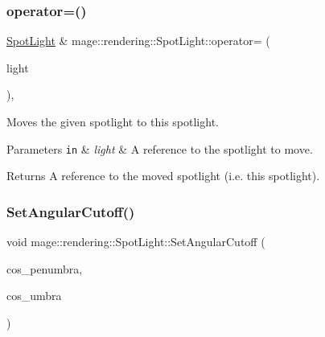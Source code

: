 \subsubsection{\texorpdfstring{operator=()}{operator=()}\hspace{0.1cm}{\footnotesize\ttfamily [2/2]}}
{\footnotesize\ttfamily \hyperlink{classmage_1_1rendering_1_1_spot_light}{Spot\+Light} \& mage\+::rendering\+::\+Spot\+Light\+::operator= (\begin{DoxyParamCaption}\item[{\hyperlink{classmage_1_1rendering_1_1_spot_light}{Spot\+Light} \&\&}]{light }\end{DoxyParamCaption})\hspace{0.3cm}{\ttfamily [default]}, {\ttfamily [noexcept]}}

Moves the given spotlight to this spotlight.


\begin{DoxyParams}[1]{Parameters}
\mbox{\tt in}  & {\em light} & A reference to the spotlight to move. \\
\hline
\end{DoxyParams}
\begin{DoxyReturn}{Returns}
A reference to the moved spotlight (i.\+e. this spotlight). 
\end{DoxyReturn}
\hypertarget{classmage_1_1rendering_1_1_spot_light_a92a3b92e8a789c038c0f9058b1ff5a48}{}\label{classmage_1_1rendering_1_1_spot_light_a92a3b92e8a789c038c0f9058b1ff5a48} 
\subsubsection{\texorpdfstring{Set\+Angular\+Cutoff()}{SetAngularCutoff()}}
{\footnotesize\ttfamily void mage\+::rendering\+::\+Spot\+Light\+::\+Set\+Angular\+Cutoff (\begin{DoxyParamCaption}\item[{\hyperlink{namespacemage_aa97e833b45f06d60a0a9c4fc22ae02c0}{F32}}]{cos\+\_\+penumbra,  }\item[{\hyperlink{namespacemage_aa97e833b45f06d60a0a9c4fc22ae02c0}{F32}}]{cos\+\_\+umbra }\end{DoxyParamCaption})\hspace{0.3cm}{\ttfamily [noexcept]}}

